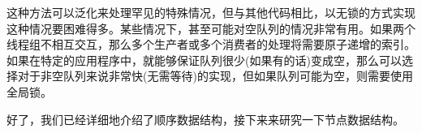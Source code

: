 这种方法可以泛化来处理罕见的特殊情况，但与其他代码相比，以无锁的方式实现这种情况要困难得多。某些情况下，甚至可能对空队列的情况非常有用。如果两个线程组不相互交互，那么多个生产者或多个消费者的处理将需要原子递增的索引。如果在特定的应用程序中，就能够保证队列很少(如果有的话)变成空，那么可以选择对于非空队列来说非常快(无需等待)的实现，但如果队列可能为空，则需要使用全局锁。

好了，我们已经详细地介绍了顺序数据结构，接下来来研究一下节点数据结构。






























